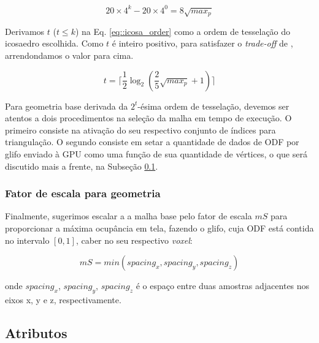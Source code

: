 \documentclass[
    12pt,                %
    oneside,            %
    a4paper,            %
    english,            %
    french,                %
    spanish,            %
    brazil                %
    ]{abntex2}
\begin{document}
\begin{equation}
\label{eq::icosa_order_base}
     20\times 4^k - 20\times 4^0 = 8\sqrt{max_p}
\end{equation}

Derivamos $t$ ($t \leq k$) na Eq. \ref{eq::icosa_order} como a ordem de tesselação do icosaedro escolhida. Como $t$ é inteiro positivo, para satisfazer o \textit{trade-off} de , arrendondamos o valor para cima.

\begin{equation}
\label{eq::icosa_order}
     t = \lceil \frac{1}{2}\log_2{(\frac{2}{5}\sqrt{max_p} + 1)} \rceil
\end{equation}

Para geometria base derivada da $2^t$-ésima ordem de tesselação, devemos ser atentos a dois procedimentos na seleção da malha em tempo de execução. O primeiro consiste na ativação do seu respectivo conjunto de índices para triangulação. O segundo consiste em setar a quantidade de dados de ODF por glifo enviado à GPU como uma função de sua quantidade de vértices, o que será discutido mais a frente, na Subseção \ref{ssec::atributos}.

\subsubsection{Fator de escala para geometria}

Finalmente, sugerimos escalar a a malha base pelo fator de escala $mS$ para proporcionar a máxima ocupância em tela, fazendo o glifo, cuja ODF está contida no intervalo $[0, 1]$, caber no seu respectivo \textit{voxel}:

\begin{equation}
\label{eq:spacings}
mS = min(spacing_x, spacing_y, spacing_z)
\end{equation}


onde $spacing_x$, $spacing_y$, $spacing_z$ é o espaço entre duas amostras adjacentes nos eixos x, y e z, respectivamente.






\subsection{Atributos}
\label{ssec::atributos}
\end{document}
